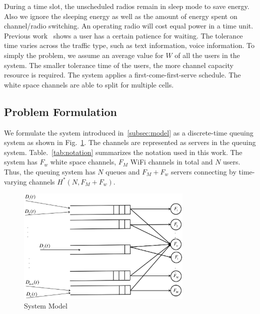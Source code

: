 During a time slot, the unscheduled radios remain in sleep mode to save energy. Also we ignore 
the sleeping energy as well as the amount of energy spent on channel/radio switching. An operating 
radio will cost equal power in a time unit. Previous work~\cite{niida2010user} shows a user has a 
certain patience for waiting. The tolerance time varies across the traffic type, such as text information, 
voice information. To simply the problem, we assume an average value for $W$ of all the users in the system. 
The smaller tolerance time of the users, the more channel capacity resource is required.
The system applies a first-come-first-serve schedule. The white space channels are able to split for multiple 
cells.

\subsection{Problem Formulation}
\label{subsec:problem}

We formulate the system introduced in~\ref{subsec:model} as a discrete-time queuing system as shown in 
Fig.~\ref{fig:flowconfig}. 
The channels are represented as servers in the queuing system. 
Table.~\ref{tab:notation} summarizes the notation used in this work. 
The system has $F_w$ white space channels, $F_M$ WiFi channels in total and $N$ users.
Thus, the queuing system has $N$ queues and $F_M+F_w$ servers connecting by time-varying 
channels $H^*(N,F_M+F_w)$.




\begin{figure}
\vspace{-0.0in}
\centering
\includegraphics[width=84mm]{figures/flowconfig}
\vspace{-0.1in}
\caption{System Model}
\label{fig:flowconfig}
\vspace{-0.1in}
\end{figure}

